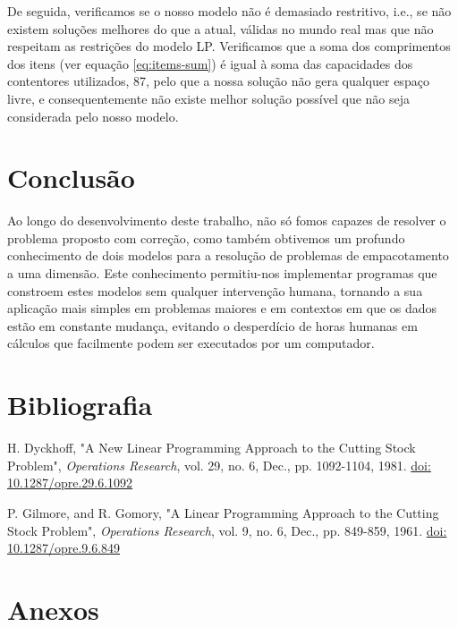 \documentclass[12pt, a4paper, titlepage]{article}
\begin{document}
De seguida, verificamos se o nosso modelo não é demasiado restritivo, i.e., se não existem soluções
melhores do que a atual, válidas no mundo real mas que não respeitam as restrições do modelo LP.
Verificamos que a soma dos comprimentos dos itens (ver equação \ref{eq:items-sum}) é igual à soma
das capacidades dos contentores utilizados, 87, pelo que a nossa solução não gera qualquer espaço
livre, e consequentemente não existe melhor solução possível que não seja considerada pelo nosso
modelo.

\section{Conclusão}

Ao longo do desenvolvimento deste trabalho, não só fomos capazes de resolver o problema proposto
com correção, como também obtivemos um profundo conhecimento de dois modelos para a resolução de
problemas de empacotamento a uma dimensão. Este conhecimento permitiu-nos implementar programas que
constroem estes modelos sem qualquer intervenção humana, tornando a sua aplicação mais simples em
problemas maiores e em contextos em que os dados estão em constante mudança, evitando o desperdício
de horas humanas em cálculos que facilmente podem ser executados por um computador.

\section{Bibliografia}
\def\refname{}
\vspace{-1.5cm}
\begin{thebibliography}{9}
    H. Dyckhoff, "A New Linear Programming Approach to the Cutting Stock Problem",
    \emph{Operations Research}, vol. 29, no. 6, Dec., pp. 1092-1104, 1981.
    \href{https://doi.org/10.1287/opre.29.6.1092}{doi: 10.1287/opre.29.6.1092}

    P. Gilmore, and R. Gomory, "A Linear Programming Approach to the Cutting Stock Problem",
    \emph{Operations Research}, vol. 9, no. 6, Dec., pp. 849-859, 1961.
    \href{https://doi.org/10.1287/opre.9.6.849}{doi: 10.1287/opre.9.6.849}
\end{thebibliography}

\section{Anexos}
\end{document}
